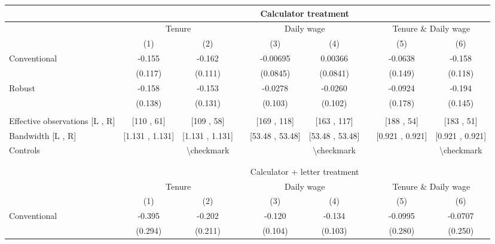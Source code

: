 \begin{tabular}{lcccccccc}
\toprule
      & \multicolumn{8}{c}{Calculator treatment} \\
\midrule
      & \multicolumn{2}{c}{Tenure} &       & \multicolumn{2}{c}{Daily wage} &       & \multicolumn{2}{c}{Tenure \& Daily wage} \\
\cmidrule{2-3}\cmidrule{5-6}\cmidrule{8-9}      & (1)   & (2)   &       & (3)   & (4)   &       & (5)   & (6) \\
\midrule
\midrule
Conventional & -0.155 & -0.162 &       & -0.00695 & 0.00366 &       & -0.0638 & -0.158 \\
      & (0.117) & (0.111) &       & (0.0845) & (0.0841) &       & (0.149) & (0.118) \\
Robust & -0.158 & -0.153 &       & -0.0278 & -0.0260 &       & -0.0924 & -0.194 \\
      & (0.138) & (0.131) &       & (0.103) & (0.102) &       & (0.178) & (0.145) \\
      &       &       &       &       &       &       &       &  \\
\midrule
Effective observations [L , R] & [110 ,  61] & [109 ,  58] &       & [169 ,  118] & [163 ,  117] &       & [188 ,  54] & [183 ,  51] \\
Bandwidth [L , R] & [1.131 ,  1.131] & [1.131 ,  1.131] &       & [53.48 ,  53.48] & [53.48 ,  53.48] &       & [0.921 ,  0.921] & [0.921 ,  0.921] \\
Controls &       & \textbackslash{}checkmark &       &       & \textbackslash{}checkmark &       &       & \textbackslash{}checkmark \\
\midrule
\midrule
      &       &       &       &       &       &       &       &  \\
      &       &       &       &       &       &       &       &  \\
\midrule
      & \multicolumn{8}{c}{Calculator + letter treatment} \\
\midrule
      & \multicolumn{2}{c}{Tenure} &       & \multicolumn{2}{c}{Daily wage} &       & \multicolumn{2}{c}{Tenure \& Daily wage} \\
\cmidrule{2-3}\cmidrule{5-6}\cmidrule{8-9}      & (1)   & (2)   &       & (3)   & (4)   &       & (5)   & (6) \\
\midrule
\midrule
Conventional & -0.395 & -0.202 &       & -0.120 & -0.134 &       & -0.0995 & -0.0707 \\
      & (0.294) & (0.211) &       & (0.104) & (0.103) &       & (0.280) & (0.250) \\

\end{tabular}
